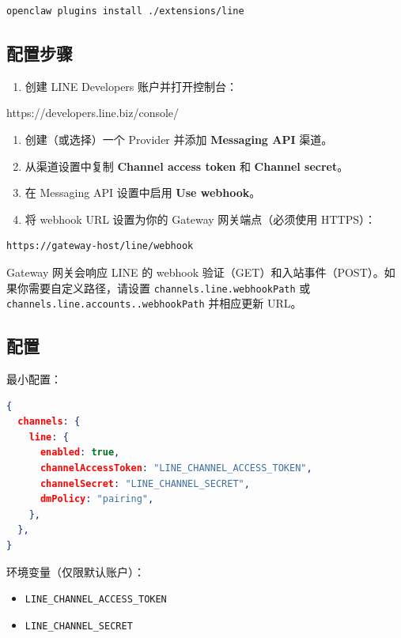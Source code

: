 \begin{lstlisting}[language=bash]
openclaw plugins install ./extensions/line
\end{lstlisting}


\subsection{配置步骤}


\begin{enumerate}
  \item 创建 LINE Developers 账户并打开控制台：
\end{enumerate}

https://developers.line.biz/console/
\begin{enumerate}
  \item 创建（或选择）一个 Provider 并添加 \textbf{Messaging API} 渠道。
  \item 从渠道设置中复制 \textbf{Channel access token} 和 \textbf{Channel secret}。
  \item 在 Messaging API 设置中启用 \textbf{Use webhook}。
  \item 将 webhook URL 设置为你的 Gateway 网关端点（必须使用 HTTPS）：
\end{enumerate}


\begin{lstlisting}
https://gateway-host/line/webhook
\end{lstlisting}


Gateway 网关会响应 LINE 的 webhook 验证（GET）和入站事件（POST）。如果你需要自定义路径，请设置 \texttt{channels.line.webhookPath} 或 \texttt{channels.line.accounts..webhookPath} 并相应更新 URL。

\subsection{配置}


最小配置：

\begin{lstlisting}[language=json]
{
  channels: {
    line: {
      enabled: true,
      channelAccessToken: "LINE_CHANNEL_ACCESS_TOKEN",
      channelSecret: "LINE_CHANNEL_SECRET",
      dmPolicy: "pairing",
    },
  },
}
\end{lstlisting}


环境变量（仅限默认账户）：

\begin{itemize}
  \item \texttt{LINE\_CHANNEL\_ACCESS\_TOKEN}
  \item \texttt{LINE\_CHANNEL\_SECRET}
\end{itemize}



